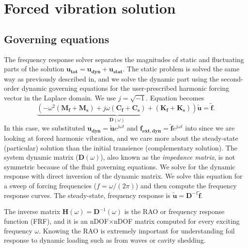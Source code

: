 \documentclass[10pt]{article}
\newcommand{\mbf}[1]{\mathbf{#1}}
\newcommand{\be}{\begin{eqnarray}}
\newcommand{\ee}{\end{eqnarray}}
\begin{document}
\section{Forced vibration solution}
\subsection{Governing equations}
The {frequency response solver} separates the magnitudes of static and fluctuating parts of the solution
%
$\mbf{u_{tot}}= \mbf{{u}_{dyn}} + \mbf{u_{stat}}$.
%
The static problem is solved the same way as previously described in, and we solve the dynamic part using the second-order dynamic governing equations for the user-prescribed harmonic forcing vector in the Laplace domain.
We use $j = \sqrt{-1}$.
Equation becomes
\begin{equation}
	\label{eqn:dyn}
	\underbrace{
		\left(-\omega^2  \left(\mbf{M_f + M_s}  \right) +
		j\omega    \left(\mbf{C_f +C_s}\right) + \left(\mbf{K_f + K_s}\right) \right)
	}_{\mbf{D}(\omega)}
	\mbf{\tilde{u}}
	= \mbf{\tilde{f}}.
\end{equation}
%
In this case, we substituted $\mbf{u_{dyn}} =\mbf{\tilde{u}}e^{j \omega  t}$ and $\mbf{f_{ext,dyn}} = \mbf{\tilde{f}}e^{j \omega t}$ into  since we are looking at forced harmonic vibration, and we care more about the steady-state (particular) solution than the initial transience (complementary solution).
The system dynamic matrix ($\mbf{D}(\omega)$), also known as the \emph{impedance matrix}, is not symmetric because of the fluid governing equations.
We solve for the dynamic response with direct inversion of the dynamic matrix.
We solve this equation for a sweep of forcing frequencies ($f = \omega/(2 \pi)$) and then compute the frequency response curves.
The steady-state, frequency response is $\mbf{\tilde{u}} = \mbf{D}^{-1}\mbf{\tilde{f}}$.

The inverse matrix $\mbf{H}(\omega) = \mbf{D}^{-1}(\omega)$ is the RAO or frequency response function (FRF), and it is an nDOF$\times$nDOF matrix computed for every exciting frequency $\omega$.
Knowing the RAO is extremely important for understanding foil response to dynamic loading such as from waves or cavity shedding.
\end{document}
